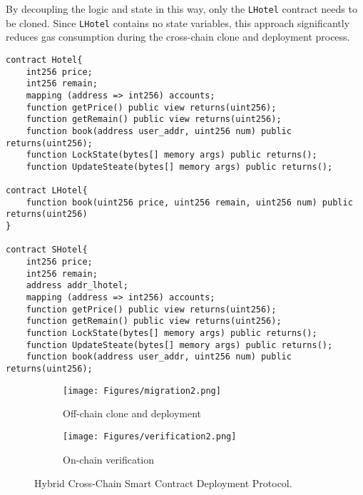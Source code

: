 By decoupling the logic and state in this way, only the \texttt{LHotel} contract needs to be cloned. 
Since \texttt{LHotel} contains no state variables, this approach significantly reduces gas consumption during the cross-chain clone and deployment process.

\begin{lstlisting}[language=Solidity, caption={Pseudocode of Hotel Logic-State Decoupling}, label={ex}]
contract Hotel{
    int256 price;
    int256 remain;
    mapping (address => int256) accounts;
    function getPrice() public view returns(uint256); 
    function getRemain() public view returns(uint256); 
    function book(address user_addr, uint256 num) public returns(uint256); 
    function LockState(bytes[] memory args) public returns();
    function UpdateSteate(bytes[] memory args) public returns();

contract LHotel{
    function book(uint256 price, uint256 remain, uint256 num) public returns(uint256)
}

contract SHotel{
    int256 price;
    int256 remain;
    address addr_lhotel;
    mapping (address => int256) accounts;
    function getPrice() public view returns(uint256); 
    function getRemain() public view returns(uint256); 
    function LockState(bytes[] memory args) public returns();
    function UpdateSteate(bytes[] memory args) public returns();
    function book(address user_addr, uint256 num) public returns(uint256);

\end{lstlisting}




\begin{figure}[t]
    \centering
    \begin{subfigure}[b]{0.525\textwidth}
        \centering
        \texttt{[image: Figures/migration2.png]}  %
        \vspace{-10pt}
        \caption{Off-chain clone and deployment}
        \label{migration}
    \end{subfigure}
    \begin{subfigure}[b]{0.525\textwidth}
        \centering
        \texttt{[image: Figures/verification2.png]}  %
        \vspace{-10pt}
        \caption{On-chain verification}
        \label{verifaction}  %
    \end{subfigure}
    \vspace{-18pt}
    \caption{Hybrid Cross-Chain Smart Contract Deployment Protocol.}
    \label{MandV}  %
\end{figure}



